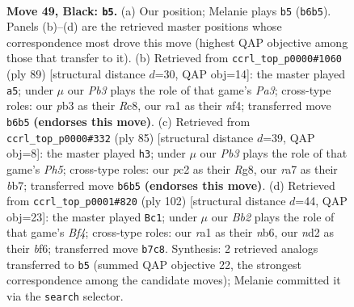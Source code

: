 \documentclass[11pt]{article}
\begin{document}
\clearpage

\begin{figure}[p]\centering
\begin{subfigure}{0.46\textwidth}\centering
\resizebox{\linewidth}{!}{%
\newchessgame
\chessboard[
  setfen={1r2r3/Rb3p1k/1p4p1/8/7P/1P6/2PN1K2/R2B4 b - - 0 49},
  showmover=false,
  pgfstyle=straightmove, color=movearrow, markmove={b6-b5}
]}
\caption{}
\end{subfigure}\hfill
\begin{subfigure}{0.46\textwidth}\centering
\resizebox{\linewidth}{!}{%
\newchessgame
\chessboard[
  setfen={2r4k/7p/pbr5/8/1R3N2/8/P1P1R2P/7K b - - 14 45},
  showmover=false,
  pgfstyle=straightmove, color=movearrow, markmove={a6-a5}
]}
\caption{}
\end{subfigure}
\\[4pt]
\begin{subfigure}{0.46\textwidth}\centering
\resizebox{\linewidth}{!}{%
\newchessgame
\chessboard[
  setfen={6rk/1B1b4/p2P1pr1/P3p3/7p/1R6/3R2P1/7K b - - 0 43},
  showmover=false,
  pgfstyle=straightmove, color=movearrow, markmove={h4-h3}
]}
\caption{}
\end{subfigure}\hfill
\begin{subfigure}{0.46\textwidth}\centering
\resizebox{\linewidth}{!}{%
\newchessgame
\chessboard[
  setfen={r7/1N2p3/1np2bk1/8/5Br1/2P5/1P3R2/1K5R w - - 21 52},
  showmover=false,
  pgfstyle=straightmove, color=movearrow, markmove={f4-c1}
]}
\caption{}
\end{subfigure}
\caption{\textbf{Move 49, Black: \texttt{b5}.} (a) Our position; Melanie plays \texttt{b5} (\texttt{b6b5}). Panels (b)--(d) are the retrieved master positions whose correspondence most drove this move (highest QAP objective among those that transfer to it). (b) Retrieved from \texttt{ccrl\_top\_p0000\#1060} (ply 89) [structural distance $d$=30, QAP obj=14]: the master played \texttt{a5}; under $\mu$ our \emph{Pb3} plays the role of that game's \emph{Pa3}; cross-type roles: our \emph{p}b3 as their \emph{R}c8, our \emph{r}a1 as their \emph{n}f4; transferred move \texttt{b6b5} \textbf{(endorses this move)}. (c) Retrieved from \texttt{ccrl\_top\_p0000\#332} (ply 85) [structural distance $d$=39, QAP obj=8]: the master played \texttt{h3}; under $\mu$ our \emph{Pb3} plays the role of that game's \emph{Ph5}; cross-type roles: our \emph{p}c2 as their \emph{R}g8, our \emph{r}a7 as their \emph{b}b7; transferred move \texttt{b6b5} \textbf{(endorses this move)}. (d) Retrieved from \texttt{ccrl\_top\_p0001\#820} (ply 102) [structural distance $d$=44, QAP obj=23]: the master played \texttt{Bc1}; under $\mu$ our \emph{Bb2} plays the role of that game's \emph{Bf4}; cross-type roles: our \emph{r}a1 as their \emph{n}b6, our \emph{n}d2 as their \emph{b}f6; transferred move \texttt{b7c8}. Synthesis: 2 retrieved analogs transferred to \texttt{b5} (summed QAP objective 22, the strongest correspondence among the candidate moves); Melanie committed it via the \texttt{search} selector.}
\label{fig:thought-m97}
\end{figure}
\end{document}
